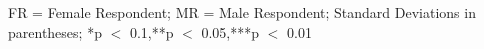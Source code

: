 \begin{table}[hp]
{\begin{tabularx}{\linewidth}{lCCCCCCC}
\end{tabularx}
\begin{flushleft}
\footnotesize FR = Female Respondent; MR = Male Respondent; Standard Deviations in parentheses; *p $<$ 0.1,**p $<$ 0.05,***p $<$ 0.01
\end{flushleft}
}
\end{table}
